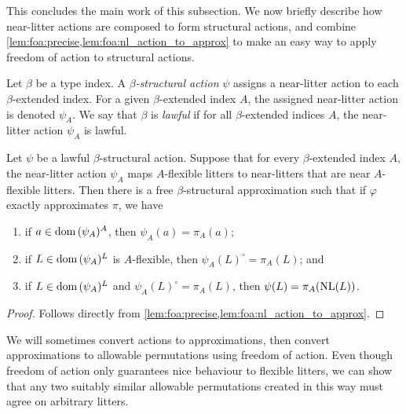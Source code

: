 This concludes the main work of this subsection.
We now briefly describe how near-litter actions are composed to form structural actions, and combine \cref{lem:foa:precise,lem:foa:nl_action_to_approx} to make an easy way to apply freedom of action to structural actions.

\begin{definition}
    Let \( \beta \) be a type index.
    A \emph{\( \beta \)-structural action} \( \psi \) assigns a near-litter action to each \( \beta \)-extended index.
    For a given \( \beta \)-extended index \( A \), the assigned near-litter action is denoted \( \psi_A \).
    We say that \( \beta \) is \emph{lawful} if for all \( \beta \)-extended indices \( A \), the near-litter action \( \psi_A \) is lawful.
\end{definition}

\begin{proposition}
    \label{lem:foa:struct_action_to_approx}
    Let \( \psi \) be a lawful \( \beta \)-structural action.
    Suppose that for every \( \beta \)-extended index \( A \), the near-litter action \( \psi_A \) maps \( A \)-flexible litters to near-litters that are near \( A \)-flexible litters.
    Then there is a free \( \beta \)-structural approximation such that if \( \varphi \) exactly approximates \( \pi \), we have
    \begin{enumerate}
        \item if \( a \in \operatorname{dom}{(\psi_A)^A} \), then \( \psi_A(a) = \pi_A(a) \);
        \item if \( L \in \operatorname{dom}{(\psi_A)^L} \) is \( A \)-flexible, then \( \psi_A(L)^\circ = \pi_A(L) \); and
        \item if \( L \in \operatorname{dom}{(\psi_A)^L} \) and \( \psi_A(L)^\circ = \pi_A(L) \), then \( \psi(L) = \pi_A(\operatorname{NL}(L)) \).
    \end{enumerate}
\end{proposition}
\begin{proof}
    Follows directly from \cref{lem:foa:precise,lem:foa:nl_action_to_approx}.
\end{proof}

We will sometimes convert actions to approximations, then convert approximations to allowable permutations using freedom of action.
Even though freedom of action only guarantees nice behaviour to flexible litters, we can show that any two suitably similar allowable permutations created in this way must agree on arbitrary litters.

